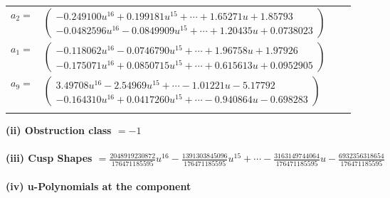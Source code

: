 \documentclass[1p]{elsarticle_modified}
\theoremstyle{definition}
\begin{document}
\begin{tabular}{m{7pt} m{180pt} m{7pt} m{180pt} }
\flushright $a_{2}=$&$\begin{pmatrix}-0.249100 u^{16}+0.199181 u^{15}+\cdots+1.65271 u+1.85793\\-0.0482596 u^{16}-0.0849909 u^{15}+\cdots+1.20435 u+0.0738023\end{pmatrix}$ \\
\flushright $a_{1}=$&$\begin{pmatrix}-0.118062 u^{16}-0.0746790 u^{15}+\cdots+1.96758 u+1.97926\\-0.175071 u^{16}+0.0850715 u^{15}+\cdots+0.615613 u+0.0952905\end{pmatrix}$ \\
\flushright $a_{9}=$&$\begin{pmatrix}3.49708 u^{16}-2.54969 u^{15}+\cdots-1.01221 u-5.17792\\-0.164310 u^{16}+0.0417260 u^{15}+\cdots-0.940864 u-0.698283\end{pmatrix}$\\&\end{tabular}
\flushleft \textbf{(ii) Obstruction class $= -1$}\\~\\
\flushleft \textbf{(iii) Cusp Shapes $= \frac{2048919230872}{176471185595} u^{16}-\frac{1391303845096}{176471185595} u^{15}+\cdots-\frac{3163149744064}{176471185595} u-\frac{6932356318654}{176471185595}$}\\~\\
\newpage\renewcommand{\arraystretch}{1}
\flushleft \textbf{(iv) u-Polynomials at the component}\newline \\
\end{document}
